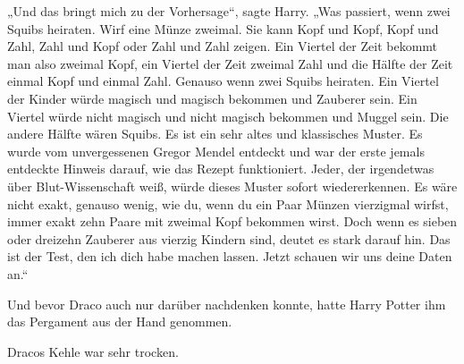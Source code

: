 „Und das bringt mich zu der Vorhersage“, sagte Harry. „Was passiert, wenn zwei Squibs heiraten. Wirf eine Münze zweimal. Sie kann Kopf und Kopf, Kopf und Zahl, Zahl und Kopf oder Zahl und Zahl zeigen. Ein Viertel der Zeit bekommt man also zweimal Kopf, ein Viertel der Zeit zweimal Zahl und die Hälfte der Zeit einmal Kopf und einmal Zahl. Genauso wenn zwei Squibs heiraten. Ein Viertel der Kinder würde magisch und magisch bekommen und Zauberer sein. Ein Viertel würde nicht magisch und nicht magisch bekommen und Muggel sein. Die andere Hälfte wären Squibs. Es ist ein sehr altes und klassisches Muster. Es wurde vom unvergessenen Gregor Mendel entdeckt und war der erste jemals entdeckte Hinweis darauf, wie das Rezept funktioniert. Jeder, der irgendetwas über Blut-Wissenschaft weiß, würde dieses Muster sofort wiedererkennen. Es wäre nicht exakt, genauso wenig, wie du, wenn du ein Paar Münzen vierzigmal wirfst, immer exakt zehn Paare mit zweimal Kopf bekommen wirst. Doch wenn es sieben oder dreizehn Zauberer aus vierzig Kindern sind, deutet es stark darauf hin. Das ist der Test, den ich dich habe machen lassen. Jetzt schauen wir uns deine Daten an.“

Und bevor Draco auch nur darüber nachdenken konnte, hatte Harry Potter ihm das Pergament aus der Hand genommen.

Dracos Kehle war sehr trocken.

